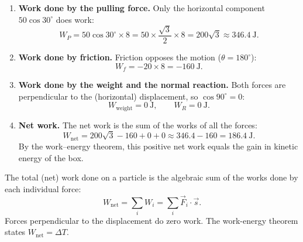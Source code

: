 \documentclass[11pt]{article}
\begin{document}
\begin{corrige}
\begin{enumerate}
\item \textbf{Work done by the pulling force.} Only the horizontal component $50\cos 30^{\circ}$ does work:
\[
W_{P} = 50\cos 30^{\circ}\times 8 = 50\times\frac{\sqrt{3}}{2}\times 8 = 200\sqrt{3}\approx 346.4\ \mathrm{J}.
\]

\item \textbf{Work done by friction.} Friction opposes the motion ($\theta = 180^{\circ}$):
\[
W_{f} = -20\times 8 = -160\ \mathrm{J}.
\]

\item \textbf{Work done by the weight and the normal reaction.} Both forces are perpendicular to the (horizontal) displacement, so $\cos 90^{\circ} = 0$:
\[
W_{\text{weight}} = 0\ \mathrm{J}, \qquad W_{R} = 0\ \mathrm{J}.
\]

\item \textbf{Net work.} The net work is the sum of the works of all the forces:
\[
W_{\text{net}} = 200\sqrt{3} - 160 + 0 + 0 \approx 346.4 - 160 = 186.4\ \mathrm{J}.
\]
By the work--energy theorem, this positive net work equals the gain in kinetic energy of the box.
\end{enumerate}

\begin{aretenir}
The total (net) work done on a particle is the algebraic sum of the works done by each individual force:
\[
W_{\text{net}} = \sum_i W_i = \sum_i \vec{F}_i \cdot \vec{s}.
\]
Forces perpendicular to the displacement do zero work. The work-energy theorem states $W_{\text{net}} = \Delta T$.
\end{aretenir}
\end{corrige}
\end{document}
